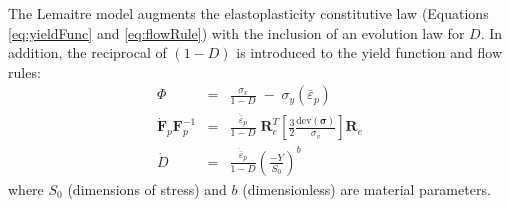 \documentclass[sn-mathphys,Numbered]{sn-jnl}%
\newcommand{\bb}{\boldsymbol}
\begin{document}

The Lemaitre model augments the elastoplasticity constitutive law (Equations \ref{eq:yieldFunc} and \ref{eq:flowRule}) with the inclusion of an evolution law for $D$.
In addition, the reciprocal of $(1 - D)$ is introduced to the yield function and flow rules:
 \begin{eqnarray} \label{eq:lemaitre_dp}
	 \Phi &=& \frac{\sigma_v}{1 - D} \; - \; \sigma_y\left(\bar{\varepsilon}_p \right) \\
    \dot{\bb{F}}_p \bb{F}_p^{-1}
    &=&
    \frac{\dot{\bar{\varepsilon}}_p}{1 - D} \; \bb{R}_e^T 
    \left[
    \frac{3}{2} \frac{\text{dev}\left(\boldsymbol{\sigma} \right)} {\sigma_{v}}
    \right]
     \bb{R}_e \\
    \dot{D} &=&
    \frac{\dot{\bar{\varepsilon}}_p}{1 - D}\left(\frac{-Y}{S_0}\right)^b \label{eq:lem_damage}
\end{eqnarray}
where $S_0$ (dimensions of stress) and $b$ (dimensionless) are material parameters.
\end{document}
